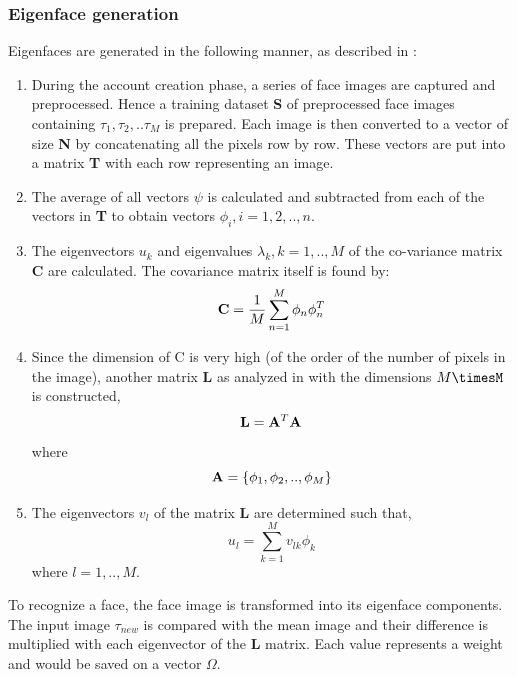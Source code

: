 \documentclass[%
        final,
        internal,
        notitlepage,
        narroweqnarray,
        inline,
        ]{ieee}
\begin{document}
\subsubsection{ Eigenface generation }
Eigenfaces are generated in the following manner, as described in \cite{Turk91}:
\begin{enumerate}
	\item During the account creation phase, a series of face images are captured and preprocessed. Hence a training dataset {\bf S} of preprocessed face images containing $\tau_{1},\tau_{2},..\tau_{M}$ is prepared. Each image is then converted to a vector of size {\bf N} by concatenating all the pixels row by row. These vectors are put into a matrix {\bf T} with each row representing an image.
	\item The average of all vectors $\psi$ is calculated and subtracted from each of the vectors in {\bf T} to obtain vectors $\phi_{i}, i = 1,2,..,n$.
	\item The eigenvectors $u_{k}$ and eigenvalues $\lambda_{k}, k = 1,..,M$ of the co-variance matrix {\bf C} are calculated. The covariance matrix itself is found by: 
\begin{equation}
{\bf C} = \frac{1}{M}\sum_{n=1}^{M}\phi_{n}\phi_{n}^{T}
\end{equation}
	\item Since the dimension of C is very high (of the order of the number of pixels in the image), another matrix {\bf L} as analyzed in \cite{Turk91} with the dimensions $M\timesM$ is constructed, 
	\begin{equation}
	{\bf L} = {\bf A}^{T}{\bf A}
	\end{equation}
	where 
	\begin{equation}
	{\bf A} = \{\phi_{1},\phi_{2},..,\phi_{M}\}
	\end{equation}
	\item The eigenvectors $v_{l}$ of the matrix {\bf L} are determined such that,
	\begin{equation}
	u_{l} = \sum_{k=1}^{M}v_{lk}\phi_{k} 
	\end{equation}
where $l = 1,..,M$.
\end{enumerate}

To recognize a face, the face image is transformed into its eigenface components. The input image $\tau_{new}$ is compared with the mean image and their difference is multiplied with each eigenvector of the {\bf L} matrix. Each value represents a weight and would be saved on a vector $\Omega$.
\end{document}
